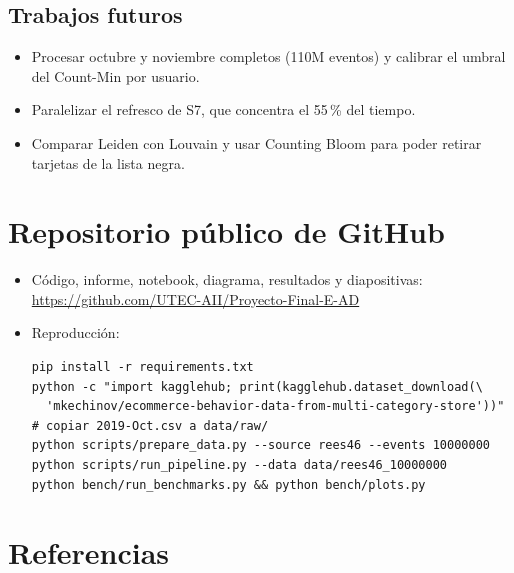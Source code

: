 \documentclass[11pt,letterpaper]{article}
\newcommand{\repo}{https://github.com/UTEC-AII/Proyecto-Final-E-AD}
\begin{document}
\subsection{Trabajos futuros}

\begin{itemize}
  \item Procesar octubre y noviembre completos (110M eventos) y calibrar el umbral del Count-Min por usuario.
  \item Paralelizar el refresco de S7, que concentra el 55\,\% del tiempo.
  \item Comparar Leiden con Louvain y usar Counting Bloom para poder retirar tarjetas de la lista negra.
\end{itemize}

\section*{Repositorio público de GitHub}

\begin{itemize}
  \item Código, informe, notebook, diagrama, resultados y diapositivas:\\ \url{\repo}
  \item Reproducción:
\begin{Verbatim}[fontsize=\footnotesize]
pip install -r requirements.txt
python -c "import kagglehub; print(kagglehub.dataset_download(\
  'mkechinov/ecommerce-behavior-data-from-multi-category-store'))"
# copiar 2019-Oct.csv a data/raw/
python scripts/prepare_data.py --source rees46 --events 10000000
python scripts/run_pipeline.py --data data/rees46_10000000
python bench/run_benchmarks.py && python bench/plots.py
\end{Verbatim}
\end{itemize}

\section*{Referencias}
\end{document}
